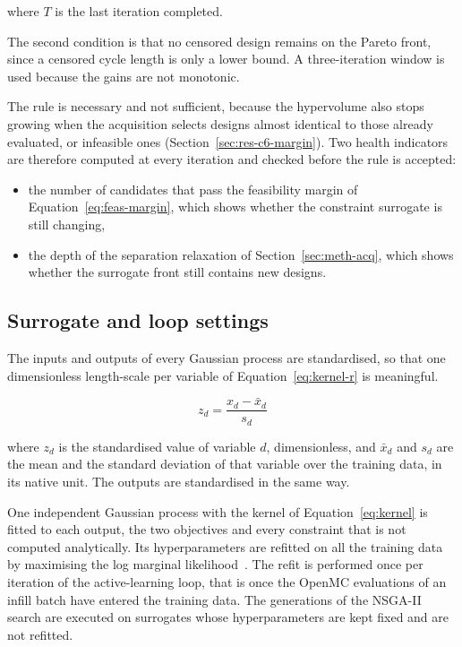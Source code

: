 \noindent where $T$ is the last iteration completed.

The second condition is that no censored design remains on the Pareto
front, since a censored cycle length is only a lower bound. A three-iteration window is
used because the gains are not monotonic.

The rule is necessary and not sufficient, because the hypervolume also
stops growing when the acquisition selects designs almost identical to
those already evaluated, or infeasible ones
(Section~\ref{sec:res-c6-margin}). Two health indicators are therefore computed at every iteration and
checked before the rule is accepted:

\begin{itemize}
  \item the number of candidates that pass the feasibility margin of
        Equation~\eqref{eq:feas-margin}, which shows whether the
        constraint surrogate is still changing,

  \item the depth of the separation relaxation of
        Section~\ref{sec:meth-acq}, which shows whether the surrogate
        front still contains new designs.
\end{itemize}

\subsection{Surrogate and loop settings}
\label{sec:meth-loop-settings}

The inputs and outputs of every Gaussian process are standardised, so
that one dimensionless length-scale per variable of
Equation~\eqref{eq:kernel-r} is meaningful.

\begin{equation}
z_d = \frac{x_d - \bar{x}_d}{s_d}
\label{eq:standardise}
\end{equation}

\noindent where $z_d$ is the standardised value of variable $d$,
dimensionless, and $\bar{x}_d$ and $s_d$ are the mean and the standard
deviation of that variable over the training data, in its native unit. The
outputs are standardised in the same way.

One independent Gaussian process with the kernel of
Equation~\eqref{eq:kernel} is fitted to each output, the two objectives
and every constraint that is not computed analytically. Its
hyperparameters are refitted on all the training data by maximising the log
marginal likelihood~\cite{rasmussen_gp_2006}. The refit is performed
once per iteration of the active-learning loop, that is once the
OpenMC evaluations of an infill batch have entered the training data. The
generations of the NSGA-II search are executed on surrogates whose
hyperparameters are kept fixed and are not refitted.

